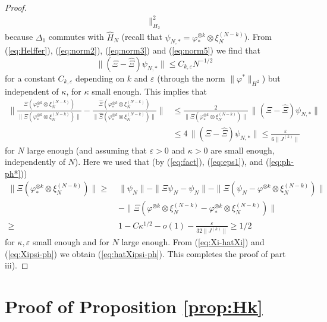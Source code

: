 \documentclass[11pt]{article}
\newcommand{\eps}{\varepsilon}
\newcommand{\ph}{\varphi}
\newcommand{\e}{\varepsilon}
\newcommand{\wh}{\widehat}
\begin{document}
\begin{proof}
\begin{equation}
\begin{split}
\|^2_{H_2}
\end{split}
\end{equation}
because $\Delta_1$ commutes with $\wh H_N$ (recall that $\psi_{N,*}=
\ph_*^{\otimes k} \otimes \xi_N^{(N-k)}$). {F}rom
(\ref{eq:Helffer}), (\ref{eq:norm2}), (\ref{eq:norm3}) and
(\ref{eq:norm5}) we find that
\[ \| (\Xi - \wh \Xi ) \psi_{N,*} \| \leq  C_{k,\e} N^{-1/2}\]
for a constant  $C_{k,\e}$ depending on $k$ and $\eps$ (through the
norm $\| \ph^* \|_{H^2}$) but independent of $\kappa$, for $\kappa$
small enough. This implies that
\begin{equation}\label{eq:Xi-hatXi}
\begin{split}
\Big\| \frac{\Xi \left( \ph_*^{\otimes k} \otimes \xi_N^{(N-k)}
\right)}{\| \Xi \left( \ph_*^{\otimes k} \otimes \xi_N^{(N-k)}
\right) \|} - \frac{\wh\Xi \left( \ph_*^{\otimes k} \otimes
\xi_N^{(N-k)} \right)}{\|\wh\Xi \left( \ph_*^{\otimes k} \otimes
\xi_N^{(N-k)} \right)\|} \Big\| &\leq \frac{2}{\|\Xi \left(
\ph_*^{\otimes k} \otimes \xi_N^{(N-k)} \right) \|} \, \|(\Xi - \wh
\Xi ) \psi_{N,*} \|  \\ &\leq 4 \, \| (\Xi - \wh \Xi ) \psi_{N,*} \|
\leq \frac{\e}{6\|J^{(k)}\|}
\end{split}
\end{equation}
for $N$ large enough (and assuming that $\e >0$ and $\kappa >0$ are
small enough, independently of $N$). Here we used that (by
(\ref{eq:fact}), (\ref{eq:eps1}), and (\ref{eq:ph-ph*}))
\begin{equation}
\begin{split}
\|\Xi \left( \ph_*^{\otimes k} \otimes \xi_N^{(N-k)} \right) \| \geq
\; &\| \psi_N \| - \| \Xi \psi_N - \psi_N \| - \| \Xi \left(\psi_N
-\ph^{\otimes k} \otimes \xi_N^{(N-k)} \right)\| \\ &- \| \Xi
\left(\ph^{\otimes k} \otimes \xi_N^{(N-k)} - \ph_*^{\otimes k}
\otimes \xi_N^{(N-k)} \right)\| \\ \geq \; &1 -C \kappa^{1/2} - o(1)
- \frac{\e}{32 \| J^{(k)} \|} \geq 1/2
\end{split}
\end{equation}
for $\kappa,\eps$ small enough and for $N$ large enough. {F}rom
(\ref{eq:Xi-hatXi}) and (\ref{eq:Xipsi-ph}) we obtain
(\ref{eq:hatXipsi-ph}). This completes the proof of part iii).
\end{proof}



\section{Proof of Proposition \ref{prop:Hk}}\label{sec:proofHk}
\setcounter{equation}{0}
\end{document}
